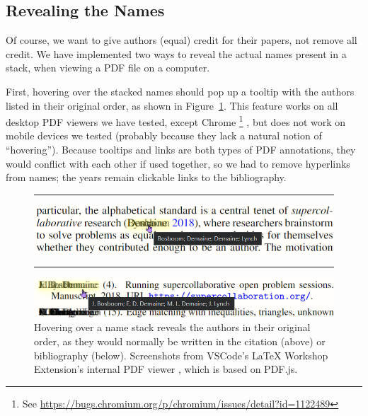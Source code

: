 \documentclass[natbib,authoryear]{sigtbd17-style}
\begin{document}
\subsection{Revealing the Names}

Of course, we want to give authors (equal) credit for their papers,
not remove all credit.
We have implemented two ways to reveal the actual names present in a stack,
when viewing a PDF file on a computer.

First, hovering over the stacked names should pop up a tooltip with the
authors listed in their original order, as shown in
Figure~\ref{fig:tooltip}.
This feature works on all desktop PDF viewers we have tested,
except Chrome%
\footnote{See \url{https://bugs.chromium.org/p/chromium/issues/detail?id=1122489}}%
, but does not work on mobile devices we tested
(probably because they lack a natural notion of ``hovering'').
Because tooltips and links are both types of PDF annotations, they would
conflict with each other if used together, so we had to remove hyperlinks
from names; the years remain clickable links to the bibliography.

\begin{figure}[htbp]
  \centering
  \hrule

  \includegraphics[scale=0.5]{figs/tooltip-text.png}

  \hrule

  \includegraphics[scale=0.5]{figs/tooltip-bib.png}
  \caption{Hovering over a name stack reveals the authors in their original
    order, as they would normally be written in the citation (above)
    or bibliography (below).  Screenshots from
    VSCode's LaTeX Workshop Extension's internal PDF viewer
    \cite{latex-workshop-pdf}, which is based on PDF.js.}
  \label{fig:tooltip}
\end{figure}
\end{document}
